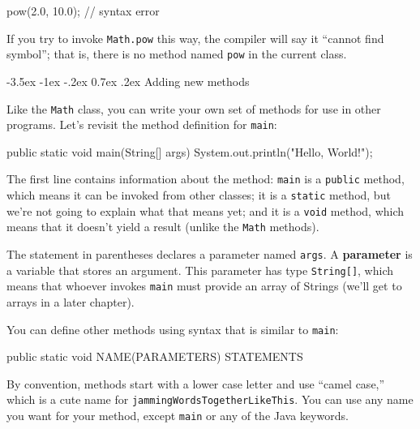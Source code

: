 \documentclass[12pt]{book}
\makeatletter
\theoremstyle{exercise}
\newcommand{\java}[1]{\verb"#1"}
\renewcommand{\section}{\@startsection{section}{1}{\z@}%
    {-3.5ex \@plus -1ex \@minus -.2ex}%
    {0.7ex \@plus.2ex}%
    {\normalfont\Large\bfseries}}
\newcommand{\java}[1]{\lstinline{#1}} %
\makeatother
\begin{document}
\begin{code}
    pow(2.0, 10.0);  // syntax error
\end{code}

If you try to invoke \java{Math.pow} this way, the compiler will say it ``cannot find symbol''; that is, there is no method named \java{pow} in the current class.


\section{Adding new methods}
\label{adding_methods}


Like the \java{Math} class, you can write your own set of methods for use in other programs.
Let's revisit the method definition for \java{main}:

\begin{code}
    public static void main(String[] args) {
        System.out.println("Hello, World!");
    }
\end{code}


The first line contains information about the method:
\java{main} is a \java{public} method, which means it can be invoked from other classes;
it is a \java{static} method, but we're not going to explain what that means yet;
and it is a \java{void} method, which means that it doesn't yield a result (unlike the \java{Math} methods).


The statement in parentheses declares a parameter named \java{args}.
A {\bf parameter} is a variable that stores an argument.
This parameter has type \java{String[]}, which means that whoever invokes \java{main} must provide an array of Strings (we'll get to arrays in a later chapter).

You can define other methods using syntax that is similar to \java{main}:

\begin{code}
    public static void NAME(PARAMETERS) {
        STATEMENTS
    }
\end{code}

By convention, methods start with a lower case letter and use ``camel case,'' which is a cute name for \java{jammingWordsTogetherLikeThis}.
You can use any name you want for your method, except \java{main} or any of the Java keywords.
\end{document}

